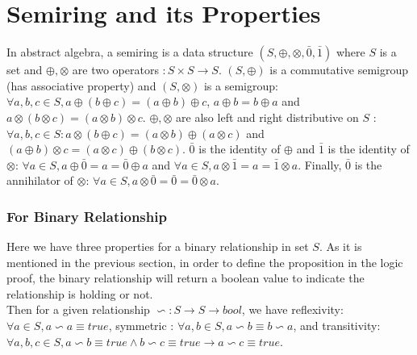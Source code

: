 \documentclass[a4paper,12pt,twoside,openright]{report}
\begin{document}
\section{Semiring and its Properties}
In abstract algebra, a semiring is a data structure $(S,\oplus,\otimes,\bar0,\bar1)$ where $S$ is a set and $\oplus,\otimes$ are two operators $:S\times S \rightarrow S$. $(S,\oplus)$ is a commutative semigroup (has associative property) and $(S,\otimes)$ is a semigroup: $\forall a,b,c \in S, a \oplus (b\oplus c) = (a \oplus b) \oplus c$, $a \oplus b = b \oplus a$ and $a \otimes (b\otimes c) = (a \otimes b) \otimes c$. $\oplus,\otimes$ are also left and right distributive on $S$ : $\forall a,b,c \in S: a \otimes(b \oplus c) = (a \otimes b) \oplus (a \otimes c)$ and $(a \oplus b) \otimes c  = (a \otimes c) \oplus (b \otimes c)$. $\bar0$ is the identity of $\oplus$ and  $\bar1$ is the identity of $\otimes$: $\forall a \in S, a \oplus \bar{0} = a = \bar{0} \oplus a$ and $\forall a \in S, a \otimes \bar{1} = a = \bar{1} \otimes a$. Finally, $\bar0$ is the  annihilator of $\otimes$: $\forall a \in S, a \otimes \bar{0} = \bar{0} = \bar{0} \otimes a$.

\subsubsection{For Binary Relationship}
Here we have three properties for a binary relationship in set $S$. As it is mentioned in the previous section, in order to define the proposition in the logic proof, the binary relationship will return a boolean value to indicate the relationship is holding or not.\\
Then for a given relationship $\backsim : S \rightarrow S \rightarrow bool$, we have reflexivity: $\forall a \in S, a \backsim a \equiv true$, symmetric : $\forall a, b \in S, a \backsim b \equiv b \backsim a$, and transitivity: $\forall a,b,c \in S, a \backsim b \equiv true \wedge b \backsim c \equiv true \rightarrow a \backsim c \equiv true$.
\end{document}
